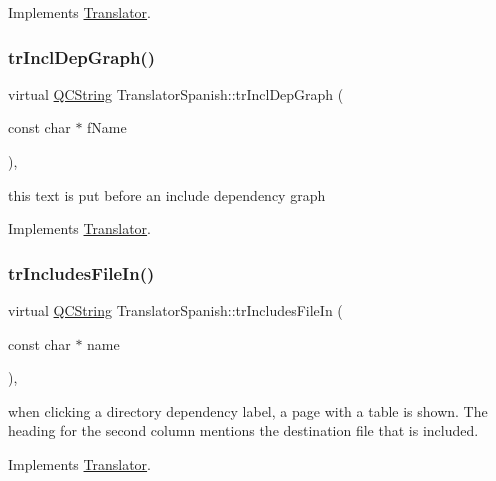 Implements \mbox{\hyperlink{class_translator}{Translator}}.

\mbox{\label{class_translator_spanish_aeac30d9e55dfb8cdd5ddf1afa5795cc6}} 
\subsubsection{\texorpdfstring{trInclDepGraph()}{trInclDepGraph()}}
{\footnotesize\ttfamily virtual \mbox{\hyperlink{class_q_c_string}{Q\+C\+String}} Translator\+Spanish\+::tr\+Incl\+Dep\+Graph (\begin{DoxyParamCaption}\item[{const char $\ast$}]{f\+Name }\end{DoxyParamCaption})\hspace{0.3cm}{\ttfamily [inline]}, {\ttfamily [virtual]}}

this text is put before an include dependency graph 

Implements \mbox{\hyperlink{class_translator}{Translator}}.

\mbox{\label{class_translator_spanish_aa3182ccb48f19f2e8ab60d07583bbd42}} 
\subsubsection{\texorpdfstring{trIncludesFileIn()}{trIncludesFileIn()}}
{\footnotesize\ttfamily virtual \mbox{\hyperlink{class_q_c_string}{Q\+C\+String}} Translator\+Spanish\+::tr\+Includes\+File\+In (\begin{DoxyParamCaption}\item[{const char $\ast$}]{name }\end{DoxyParamCaption})\hspace{0.3cm}{\ttfamily [inline]}, {\ttfamily [virtual]}}

when clicking a directory dependency label, a page with a table is shown. The heading for the second column mentions the destination file that is included. 

Implements \mbox{\hyperlink{class_translator}{Translator}}.

